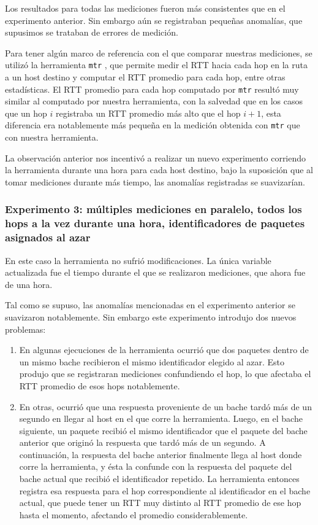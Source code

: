 \documentclass[a4paper, 10pt, twoside]{article}
\begin{document}
Los resultados para todas las mediciones fueron más consistentes que en el experimento anterior. Sin embargo aún se registraban pequeñas anomalías, que supusimos se trataban de errores de medición.

Para tener algún marco de referencia con el que comparar nuestras mediciones, se utilizó la herramienta \texttt{mtr} \cite{mtr}, que permite medir el RTT hacia cada hop en la ruta a un host destino y computar el RTT promedio para cada hop, entre otras estadísticas. El RTT promedio para cada hop computado por \texttt{mtr} resultó muy similar al computado por nuestra herramienta, con la salvedad que en los casos que un hop $i$ registraba un RTT promedio más alto que el hop $i + 1$, esta diferencia era notablemente más pequeña en la medición obtenida con \texttt{mtr} que con nuestra herramienta.

La observación anterior nos incentivó a realizar un nuevo experimento corriendo la herramienta durante una hora para cada host destino, bajo la suposición que al tomar mediciones durante más tiempo, las anomalías registradas se suavizarían.


\subsubsection{Experimento 3: múltiples mediciones en paralelo, todos los hops a la vez durante una hora, identificadores de paquetes asignados al azar}

En este caso la herramienta no sufrió modificaciones. La única variable actualizada fue el tiempo durante el que se realizaron mediciones, que ahora fue de una hora.

Tal como se supuso, las anomalías mencionadas en el experimento anterior se suavizaron notablemente. Sin embargo este experimento introdujo dos nuevos problemas:

\begin{enumerate}
  \item En algunas ejecuciones de la herramienta ocurrió que dos paquetes dentro de un mismo bache recibieron el mismo identificador elegido al azar. Esto produjo que se registraran mediciones confundiendo el hop, lo que afectaba el RTT promedio de esos hops notablemente.

  \item En otras, ocurrió que una respuesta proveniente de un bache tardó más de un segundo en llegar al host en el que corre la herramienta. Luego, en el bache siguiente, un paquete recibió el mismo identificador que el paquete del bache anterior que originó la respuesta que tardó más de un segundo. A continuación, la respuesta del bache anterior finalmente llega al host donde corre la herramienta, y ésta la confunde con la respuesta del paquete del bache actual que recibió el identificador repetido. La herramienta entonces registra esa respuesta para el hop correspondiente al identificador en el bache actual, que puede tener un RTT muy distinto al RTT promedio de ese hop hasta el momento, afectando el promedio considerablemente.
\end{enumerate}
\end{document}
